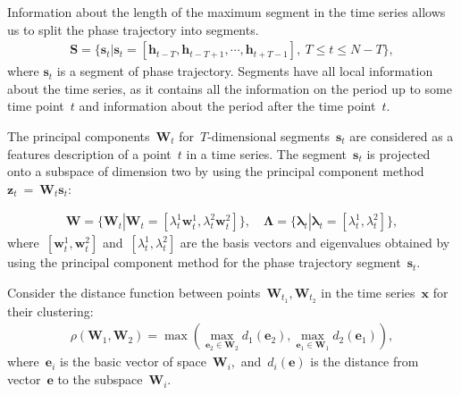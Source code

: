 \documentclass[12pt, twoside]{article}
\numberwithin{equation}{section}
\begin{document}
Information about the length of the maximum segment in the time series allows us to split the phase trajectory into segments.
\begin{equation}
\label{eq:cl:2}
\begin{aligned}
\mathbf{S} = \{\textbf{s}_t| \textbf{s}_t = [\textbf{h}_{t-T}, \textbf{h}_{t-T+1}, \cdots, \textbf{h}_{t+T-1}],~T\leq t\leq N-T\},
\end{aligned}
\end{equation}
where $\textbf{s}_t$ is a segment of phase trajectory. Segments have all local information about the time series, as it contains all the information on the period up to some time point~$t$ and information about the period after the time point~$t$.




The principal components~$\textbf{W}_t$ for~$T\text{-dimensional}$ segments~$\textbf{s}_t$ are considered as a features description of a point~$t$ in a time series. The segment~$\textbf{s}_t $ is projected onto a subspace of dimension two by using the principal component method~$\textbf{z}_t~=~\textbf{W}_t\textbf{s}_t$:

\begin{equation}
\label{eq:cl:3}
\begin{aligned}
\mathbf{W} = \{\textbf{W}_t| \textbf{W}_t = [\lambda^1_t\textbf{w}^1_t, \lambda^2_t\textbf{w}^2_t]\}, \quad \bm{\Lambda} = \{\bm{\lambda}_t| \bm{\lambda}_t=[\lambda^1_t, \lambda^2_t]\},
\end{aligned}
\end{equation}
where~$[\textbf{w}^1_t, \textbf{w}^2_t]$ and~$[\lambda^1_t, \lambda^2_t]$ are the basis vectors and eigenvalues obtained by using the principal component method for the phase trajectory segment~$\textbf{s}_t$.



Consider the distance function between points~$\mathbf{W}_{t_1},\mathbf{W}_{t_2}$ in the time series~$\textbf{x}$ for their clustering:
\begin{equation}
\label{eq:cl:4}
\begin{aligned}
\rho\left(\textbf{W}_1, \textbf{W}_2\right) = \max\left(\max_{\textbf{e}_2 \in \textbf{W}_2} d_{1}\left(\textbf{e}_2\right), \max_{\textbf{e}_1 \in \textbf{W}_1} d_{2}\left(\textbf{e}_1\right)\right),
\end{aligned}
\end{equation}
where~$\textbf{e}_i$ is the basic vector of space~$\textbf{W}_i,$ and~$d_i\left(\textbf{e}\right)$ is the distance from vector~$\textbf{e}$ to the subspace~$\textbf{W}_i$.
\end{document}
